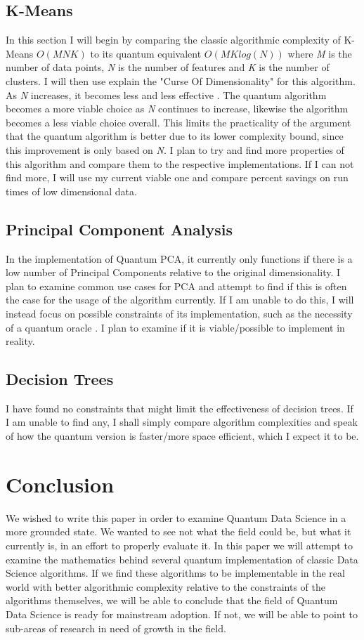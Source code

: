 \documentclass[conference]{IEEEtran}
\begin{document}
\subsection{K-Means}
In this section I will begin by comparing the classic algorithmic complexity of K-Means $O(MNK)$ to its quantum equivalent $O(MKlog(N))$ where \emph{M} is the number of data points, \emph{N} is the number of features and \emph{K} is the number of clusters. I will then use explain the "Curse Of Dimensionality" for this algorithm. As \emph{N} increases, it becomes less and less effective \cite{b15}. The quantum algorithm becomes a more viable choice as \emph{N} continues to increase, likewise the algorithm becomes a less viable choice overall. This limits the practicality of the argument that the quantum algorithm is better due to its lower complexity bound, since this improvement is only based on \emph{N}. I plan to try and find more properties of this algorithm and compare them to the respective implementations. If I can not find more, I will use my current viable one and compare percent savings on run times of low dimensional data. 

\subsection{Principal Component Analysis}
In the implementation of Quantum PCA, it currently only functions if there is a low number of Principal Components relative to the original dimensionality. I plan to examine common use cases for PCA and attempt to find if this is often the case for the usage of the algorithm currently. If I am unable to do this, I will instead focus on possible constraints of its implementation, such as the necessity of a quantum oracle \cite{b7}. I plan to examine if it is viable/possible to implement in reality.  
\subsection{Decision Trees}
I have found no constraints that might limit the effectiveness of decision trees. If I am unable to find any, I shall simply compare algorithm complexities and speak of how the quantum version is faster/more space efficient, which I expect it to be. 

\section{Conclusion}
We wished to write this paper in order to examine Quantum Data Science in a more grounded state. We wanted to see not what the field could be, but what it currently is, in an effort to properly evaluate it. In this paper we will attempt to examine the mathematics behind several quantum implementation of classic Data Science algorithms. If we find these algorithms to be implementable in the real world with better algorithmic complexity relative to the constraints of the algorithms themselves, we will be able to conclude that the field of Quantum Data Science is ready for mainstream adoption. If not, we will be able to point to sub-areas of research in need of growth in the field.  
\end{document}
